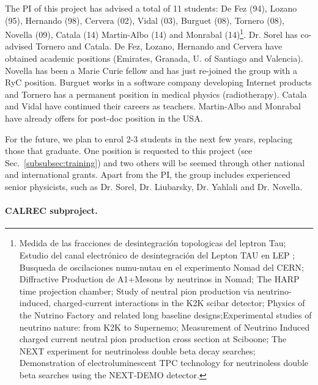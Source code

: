 The PI of this project has advised a total of 11 students: De Fez (94), Lozano (95), Hernando (98), Cervera (02), Vidal (03), Burguet (08), Tornero (08), Novella (09), Catala (14) Martin-Albo (14) and Monrabal (14)\footnote{Medida de las fracciones de desintegración topologicas del leptron Tau; Estudio del canal electrónico de desintegración del Lepton TAU en LEP ; Busqueda de oscilaciones numu-nutau en el experimento Nomad del CERN; Diffractive Production de A1+Mesons by neutrinos in Nomad; The HARP time projection chamber; Study of neutral pion production via neutrino-induced, charged-current interactions in the K2K scibar detector; Physics of the Nutrino Factory and related long baseline designs;Experimental studies of neutrino nature: from K2K to Supernemo; Measurement of Neutrino Induced charged current neutral pion production cross section at Sciboone; The NEXT experiment for neutrinoless double beta decay searches; Demonstration of electroluminescent TPC technology for neutrinoless double beta searches using the NEXT-DEMO detector.}. Dr. Sorel has co-advised Tornero and Catala. De Fez, Lozano, Hernando and Cervera have obtained academic positions (Emirates, Granada, U. of Santiago and Valencia). Novella has been a Marie Curie fellow and has just re-joined the group with a RyC position. Burguet works in a software company developing Internet products and Tornero has a permanent position in medical physics (radiotherapy). Catala and Vidal have continued their careers as teachers. Martin-Albo and Monrabal have already offers for post-doc position in the USA.

For the future, we plan to enrol 2-3 students in the next few years, replacing those that graduate. One position is requested to this project (see Sec.~\ref{subsubsec:training}) and two others will be seemed through other national and international grants. Apart from the PI, the group includes experienced senior physicists, such as Dr. Sorel, Dr. Liubarsky, Dr. Yahlali and Dr. Novella. 

\paragraph{CALREC subproject.}

